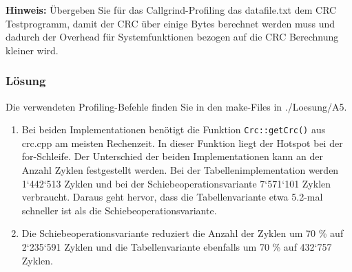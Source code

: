 \textbf{Hinweis:} Übergeben Sie für das Callgrind-Profiling das datafile.txt dem CRC Testprogramm, damit der CRC über einige Bytes berechnet werden muss und dadurch der Overhead für Systemfunktionen bezogen auf die CRC Berechnung kleiner wird.

\subsubsection{Lösung}

Die verwendeten Profiling-Befehle finden Sie in den make-Files in ./Loesung/A5.

\begin{enumerate}
  \item Bei beiden Implementationen benötigt die Funktion \texttt{Crc::getCrc()} aus crc.cpp am meisten Rechenzeit. In dieser Funktion liegt der Hotspot bei der for-Schleife. Der Unterschied der beiden Implementationen kann an der Anzahl Zyklen festgestellt werden. Bei der Tabellenimplementation werden 1‘442‘513 Zyklen und bei der Schiebeoperationsvariante 7‘571‘101 Zyklen verbraucht. Daraus geht hervor, dass die Tabellenvariante etwa 5.2-mal schneller ist als die Schiebeoperationsvariante.

  

  \item Die Schiebeoperationsvariante reduziert die Anzahl der Zyklen um 70 \% auf 2‘235‘591 Zyklen und die Tabellenvariante ebenfalls um 70 \% auf 432‘757 Zyklen.

  

\end{enumerate}
